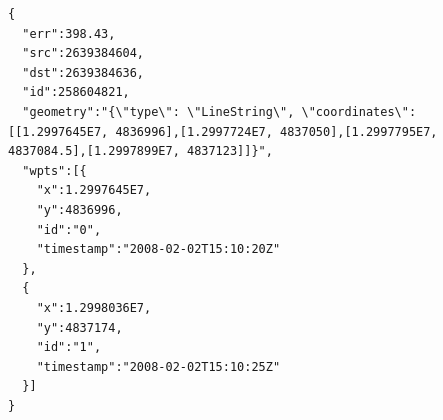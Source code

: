\begin{lstlisting}[style=java, caption=Content of a simple link object., label=lst:geojson:link]
{
  "err":398.43,
  "src":2639384604,
  "dst":2639384636,
  "id":258604821,
  "geometry":"{\"type\": \"LineString\", \"coordinates\": [[1.2997645E7, 4836996],[1.2997724E7, 4837050],[1.2997795E7, 4837084.5],[1.2997899E7, 4837123]]}",
  "wpts":[{
    "x":1.2997645E7,
    "y":4836996,
    "id":"0",
    "timestamp":"2008-02-02T15:10:20Z"
  },
  {
    "x":1.2998036E7,
    "y":4837174,
    "id":"1",
    "timestamp":"2008-02-02T15:10:25Z"
  }]
}
\end{lstlisting}